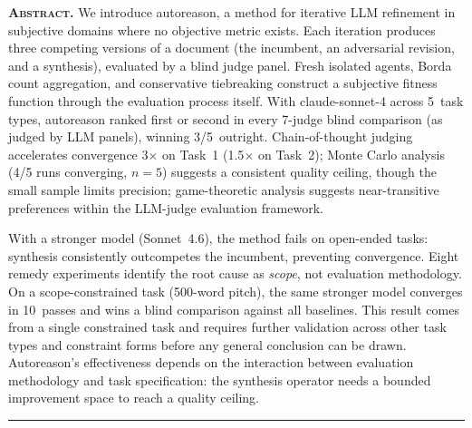 \documentclass[10pt,twocolumn]{article}
\begin{document}

\noindent\textbf{\scshape Abstract.}\enspace
We introduce autoreason, a method for iterative LLM refinement in subjective domains where no objective metric exists. Each iteration produces three competing versions of a document (the incumbent, an adversarial revision, and a synthesis), evaluated by a blind judge panel. Fresh isolated agents, Borda count aggregation, and conservative tiebreaking construct a subjective fitness function through the evaluation process itself. With claude-sonnet-4 across 5~task types, autoreason ranked first or second in every 7-judge blind comparison (as judged by LLM panels), winning 3/5~outright. Chain-of-thought judging accelerates convergence 3$\times$ on Task~1 (1.5$\times$ on Task~2); Monte Carlo analysis (4/5 runs converging, $n{=}5$) suggests a consistent quality ceiling, though the small sample limits precision; game-theoretic analysis suggests near-transitive preferences within the LLM-judge evaluation framework.

With a stronger model (Sonnet~4.6), the method fails on open-ended tasks: synthesis consistently outcompetes the incumbent, preventing convergence. Eight remedy experiments identify the root cause as \textit{scope}, not evaluation methodology. On a scope-constrained task (500-word pitch), the same stronger model converges in 10~passes and wins a blind comparison against all baselines. This result comes from a single constrained task and requires further validation across other task types and constraint forms before any general conclusion can be drawn. Autoreason's effectiveness depends on the interaction between evaluation methodology and task specification: the synthesis operator needs a bounded improvement space to reach a quality ceiling.

\vspace{6pt}
\hrule
\vspace{6pt}
\end{document}
